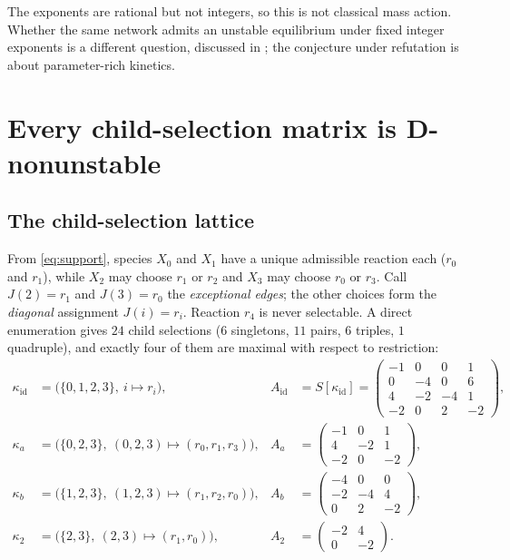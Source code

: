 \documentclass[11pt,a4paper]{article}
\theoremstyle{definition}
\theoremstyle{remark}
\begin{document}
The exponents are rational but not integers, so this is not classical mass action. Whether the same network admits an unstable equilibrium under fixed integer exponents is a different question, discussed in \cite{Companion2026}; the conjecture under refutation is about parameter-rich kinetics.

\section{Every child-selection matrix is D-nonunstable}\label{sec:children}

\subsection{The child-selection lattice}

From \eqref{eq:support}, species $X_0$ and $X_1$ have a unique admissible reaction each ($r_0$ and $r_1$), while $X_2$ may choose $r_1$ or $r_2$ and $X_3$ may choose $r_0$ or $r_3$. Call $J(2)=r_1$ and $J(3)=r_0$ the \emph{exceptional edges}; the other choices form the \emph{diagonal} assignment $J(i)=r_i$. Reaction $r_4$ is never selectable. A direct enumeration gives $24$ child selections ($6$ singletons, $11$ pairs, $6$ triples, $1$ quadruple), and exactly four of them are maximal with respect to restriction:
\begin{align}
\kappa_{\mathrm{id}}&=\bigl(\{0,1,2,3\},\ i\mapsto r_i\bigr), &
A_{\mathrm{id}}&=S[\kappa_{\mathrm{id}}]=\begin{pmatrix}-1&0&0&1\\0&-4&0&6\\4&-2&-4&1\\-2&0&2&-2\end{pmatrix},\label{eq:Aid}\\
\kappa_{a}&=\bigl(\{0,2,3\},\ (0,2,3)\mapsto(r_0,r_1,r_3)\bigr), &
A_{a}&=\begin{pmatrix}-1&0&1\\4&-2&1\\-2&0&-2\end{pmatrix},\label{eq:Aa}\\
\kappa_{b}&=\bigl(\{1,2,3\},\ (1,2,3)\mapsto(r_1,r_2,r_0)\bigr), &
A_{b}&=\begin{pmatrix}-4&0&0\\-2&-4&4\\0&2&-2\end{pmatrix},\label{eq:Ab}\\
\kappa_{2}&=\bigl(\{2,3\},\ (2,3)\mapsto(r_1,r_0)\bigr), &
A_{2}&=\begin{pmatrix}-2&4\\0&-2\end{pmatrix}.\label{eq:A2}
\end{align}
\end{document}
